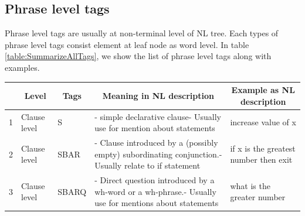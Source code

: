 \subsection{Phrase level tags}
Phrase level tags are usually at non-terminal level of NL tree. Each types of phrase level tags consist element at leaf node as word level. In table \ref{table:SummarizeAllTags}, we show the list of phrase level tags along with examples.
\begin{longtable}{|p{}|p{}|p{}|p{}|p{}|}

		\hline
		\rowcolor[HTML]{38FFF8} 
		\multicolumn{1}{|c|}{\cellcolor[HTML]{38FFF8}\textbf{No}} & \multicolumn{1}{c|}{\cellcolor[HTML]{38FFF8}\textbf{Level}} & \multicolumn{1}{c|}{\cellcolor[HTML]{38FFF8}\textbf{Tags}} & \multicolumn{1}{c|}{\cellcolor[HTML]{38FFF8}\textbf{Meaning in NL description}}                                 & \multicolumn{1}{c|}{\cellcolor[HTML]{38FFF8}\textbf{Example as NL description}} \\ \hline
		\rowcolor[HTML]{FFCCC9} 
		1                                                         & Clause level                                                & S                                                          & - simple declarative clause- Usually use for mention about statements                                           & increase value of x                                                             \\ \hline
		\rowcolor[HTML]{FFCCC9} 
		2                                                         & Clause level                                                & SBAR                                                       & - Clause introduced by a (possibly empty) subordinating conjunction.- Usually relate to if statement            & if x is the greatest number then exit                                           \\ \hline
		\rowcolor[HTML]{9AFF99} 
		3                                                         & Clause level                                                & SBARQ                                                      & - Direct question introduced by a wh-word or a wh-phrase.- Usually use for mentions about statements            & what is the greater number                                                      \\ \hline

\end{longtable}
